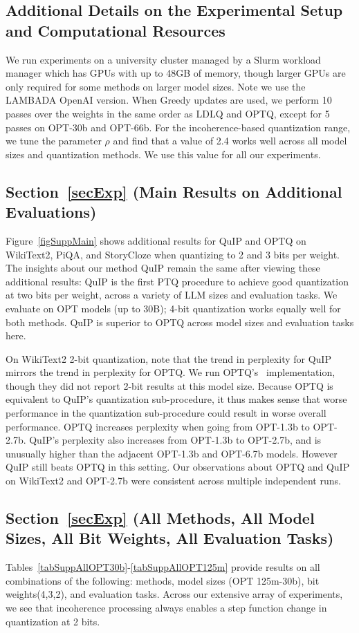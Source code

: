 \subsection{Additional Details on the Experimental Setup and Computational Resources} We run experiments on a university cluster managed by a Slurm workload manager which has GPUs with up to 48GB of memory, though larger GPUs are only required for some methods on larger model sizes. Note we use the LAMBADA OpenAI version. When Greedy updates are used, we perform 10 passes over the weights in the same order as LDLQ and OPTQ, except for 5 passes on OPT-30b and OPT-66b. For the incoherence-based quantization range, we tune the parameter $\rho$ and find that a value of 2.4 works well across all model sizes and quantization methods. We use this value for all our experiments.

\subsection{Section~\ref{secExp} 
(Main Results on Additional Evaluations) }

Figure~\ref{figSuppMain} shows additional results for QuIP and OPTQ on  WikiText2, PiQA, and StoryCloze when quantizing to 2 and 3 bits per weight. The insights about our method QuIP remain the same after viewing these additional results: QuIP is the first PTQ procedure to achieve good quantization at two bits per weight, across a variety of LLM sizes and evaluation tasks. We evaluate on OPT models (up to 30B); 4-bit quantization works equally well for both methods. QuIP is superior to OPTQ across model sizes and evaluation tasks here.

On WikiText2 2-bit quantization, note that the trend in perplexity for QuIP mirrors the trend in perplexity for OPTQ. We run OPTQ's~\cite{frantar2023gptq} implementation, though they did not report 2-bit results at this model size. Because OPTQ is equivalent to QuIP's quantization sub-procedure, it thus makes sense that worse performance in the quantization sub-procedure could result in worse overall performance. OPTQ increases perplexity when going from OPT-1.3b to OPT-2.7b. QuIP's perplexity also increases from OPT-1.3b to OPT-2.7b, and is unusually higher than the adjacent OPT-1.3b and OPT-6.7b models. However QuIP still beats OPTQ in this setting. Our observations about OPTQ and QuIP on WikiText2 and OPT-2.7b were consistent across multiple independent runs.

\subsection{Section~\ref{secExp} (All Methods, All Model Sizes, All Bit Weights, All Evaluation Tasks)}
Tables~\ref{tabSuppAllOPT30b}-\ref{tabSuppAllOPT125m} 
provide results on all combinations of the following: methods, model sizes (OPT 125m-30b), bit weights(4,3,2), and evaluation tasks. Across our extensive array of experiments, we see that incoherence processing always enables a step function change in quantization at 2 bits.

